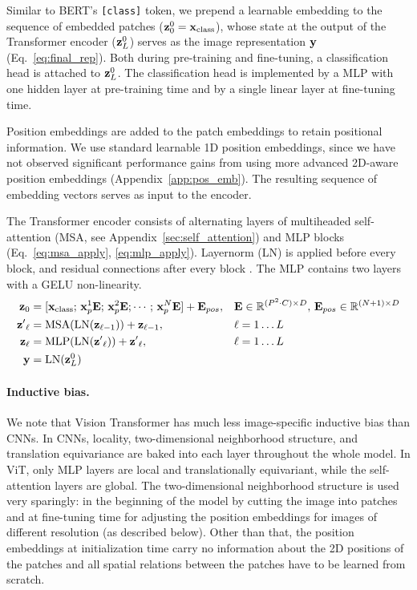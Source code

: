 Similar to BERT's \verb|[class]| token, we prepend a learnable embedding to the sequence of embedded patches ($\mathbf{z}_0^0=\mathbf{x}_\text{class}$), whose state at the output of the Transformer encoder ($\mathbf{z}^0_L$) serves as the image representation $\mathbf{y}$ (Eq.~\ref{eq:final_rep}). 
Both during pre-training and fine-tuning, a classification head is attached to $\mathbf{z}^0_L$.
The classification head is implemented by a MLP with one hidden layer at pre-training time and by a single linear layer at fine-tuning time.

Position embeddings are added to the patch embeddings to retain positional information.
We use standard learnable 1D position embeddings, since we have not observed significant performance gains from using more advanced 2D-aware position embeddings  (Appendix~\ref{app:pos_emb}).
The resulting sequence of embedding vectors serves as input to the encoder.

The Transformer encoder \citep{vaswani2017} consists of alternating layers of multiheaded self-attention (MSA, see Appendix~\ref{sec:self_attention}) and MLP blocks (Eq.~\ref{eq:msa_apply}, \ref{eq:mlp_apply}).
Layernorm (LN) is applied before every block, and residual connections after every block \citep{wang2019-preLN,Baevski2019Adaptive}.
The MLP contains two layers with a GELU non-linearity.
\begin{align}
    \mathbf{z}_0 &= [ \mathbf{x}_\text{class}; \, \mathbf{x}^1_p \mathbf{E}; \, \mathbf{x}^2_p \mathbf{E}; \cdots; \, \mathbf{x}^{N}_p \mathbf{E} ] + \mathbf{E}_{pos},
    && \mathbf{E} \in \mathbb{R}^{(P^2 \cdot C) \times D},\, \mathbf{E}_{pos}  \in \mathbb{R}^{(N + 1) \times D} \label{eq:embedding} \\
    \mathbf{z^\prime}_\ell &= \operatorname{MSA}(\operatorname{LN}(\mathbf{z}_{\ell-1})) + \mathbf{z}_{\ell-1}, && \ell=1\ldots L \label{eq:msa_apply} \\
    \mathbf{z}_\ell &= \operatorname{MLP}(\operatorname{LN}(\mathbf{z^\prime}_{\ell})) + \mathbf{z^\prime}_{\ell}, && \ell=1\ldots L  \label{eq:mlp_apply} \\
    \mathbf{y} &= \operatorname{LN}(\mathbf{z}_L^0) \label{eq:final_rep}
\end{align}

\paragraph{Inductive bias.} 
We note that Vision Transformer has much less image-specific inductive bias than CNNs. 
In CNNs, locality, two-dimensional neighborhood structure, and translation equivariance are baked into each layer throughout the whole model. 
In ViT, only MLP layers are local and translationally equivariant, while the self-attention layers are global. 
The two-dimensional neighborhood structure is used very sparingly: in the beginning of the model by cutting the image into patches and at fine-tuning time for adjusting the position embeddings for images of different resolution (as described below).
Other than that, the position embeddings at initialization time carry no information about the 2D positions of the patches and all spatial relations between the patches have to be learned from scratch.

